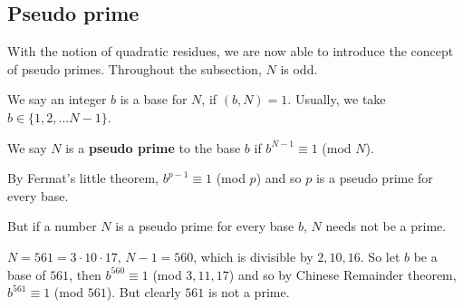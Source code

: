 \subsection{Pseudo prime}

With the notion of quadratic residues, we are now able to introduce the concept of pseudo primes. Throughout the subsection, $N$ is odd.
\begin{definition} We say an integer $b$ is a base for $N$, if $(b,N)=1$. Usually, we take
$b \in \{1,2,\ldots N-1\}$.
\end{definition}
\begin{definition} We say $N$ is a {\bf pseudo prime} to the base $b$ if $b^{N-1} \equiv 1$ (mod $N$).
\end{definition}
\begin{remark} By Fermat's little theorem, $b^{p-1} \equiv 1$ (mod $p$) and so $p$ is a pseudo prime for every base.
\end{remark}
But if a number $N$ is a pseudo prime for every base $b$, $N$ needs not be a prime.

\begin{example} 
$N=561=3 \cdot 10 \cdot 17$, $N-1=560$, which is divisible by $2,10,16$.
So let $b$ be a base of $561$, then $b^{560} \equiv 1$ (mod $3,11,17$) and so by Chinese Remainder theorem, $b^{561} \equiv 1$ (mod $561$). But clearly $561$ is not a prime.
\end{example}

